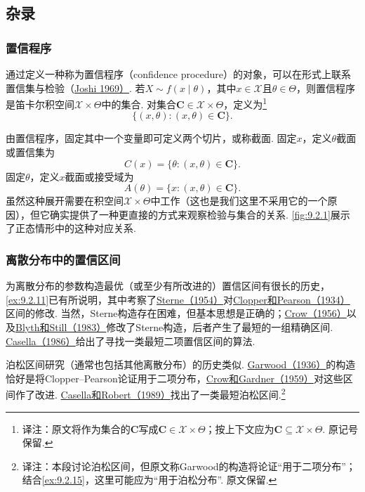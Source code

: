 \subsection{杂录}\label{sec:9.5}
\subsubsection{置信程序}\label{sec:9.5.1}
通过定义一种称为置信程序（confidence procedure）的对象，可以在形式上联系置信集与检验（\hyperref[bib:source183]{Joshi 1969）}. 若$X\sim f(x\mid\theta)$，其中$x\in\mathcal X$且$\theta\in\Theta$，则置信程序是笛卡尔积空间$\mathcal X\times\Theta$中的集合. 对集合$\boldsymbol C\in\mathcal X\times\Theta$，定义为\footnote{译注：原文将作为集合的$\boldsymbol C$写成$\boldsymbol C\in\mathcal X\times\Theta$；按上下文应为$\boldsymbol C\subseteq\mathcal X\times\Theta$. 原记号保留.}
$$\{(x,\theta):(x,\theta)\in\boldsymbol C\}.$$

由置信程序，固定其中一个变量即可定义两个切片，或称截面. 固定$x$，定义$\theta$截面或置信集为
$$C(x)=\{\theta:(x,\theta)\in\boldsymbol C\}.$$
固定$\theta$，定义$x$截面或接受域为
$$A(\theta)=\{x:(x,\theta)\in\boldsymbol C\}.$$
虽然这种展开需要在积空间$\mathcal X\times\Theta$中工作（这也是我们这里不采用它的一个原因），但它确实提供了一种更直接的方式来观察检验与集合的关系. \autoref{fig:9.2.1}展示了正态情形中的这种对应关系.
\subsubsection{离散分布中的置信区间}\label{sec:9.5.2}
为离散分布的参数构造最优（或至少有所改进的）置信区间有很长的历史，\autoref{ex:9.2.11}已有所说明，其中考察了\hyperref[bib:source305]{Sterne（1954）}对\hyperref[bib:source79]{Clopper和Pearson（1934）}区间的修改. 当然，Sterne构造存在困难，但基本思想是正确的；\hyperref[bib:source88]{Crow（1956）}以及\hyperref[bib:source40]{Blyth和Still（1983）}修改了Sterne构造，后者产生了最短的一组精确区间. \hyperref[bib:source64]{Casella（1986）}给出了寻找一类最短二项置信区间的算法.

泊松区间研究（通常也包括其他离散分布）的历史类似. \hyperref[bib:source133]{Garwood（1936）}的构造恰好是将Clopper--Pearson论证用于二项分布，\hyperref[bib:source89]{Crow和Gardner（1959）}对这些区间作了改进. \hyperref[bib:source69]{Casella和Robert（1989）}找出了一类最短泊松区间.\footnote{译注：本段讨论泊松区间，但原文称Garwood的构造将论证“用于二项分布”；结合\autoref{ex:9.2.15}，这里可能应为“用于泊松分布”. 原文保留.}

